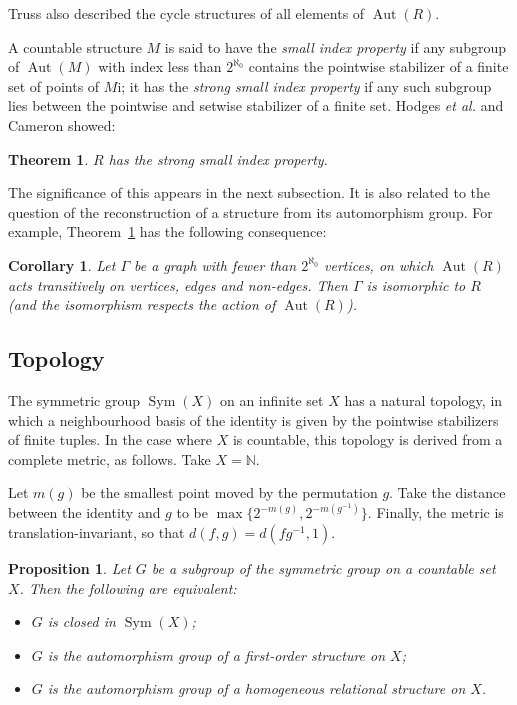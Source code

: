 \documentclass{book}
\newtheorem{theorem}{Theorem}
\newtheorem{proposition}{Proposition}
\newtheorem{corollary}{Corollary}
\DeclareMathOperator{\Sym}{Sym}
\DeclareMathOperator{\Aut}{Aut}
\begin{document}
Truss also described the cycle structures of all elements of 
$\Aut(R)$.

A countable structure $M$ is said to have the \emph{small index
property} if any subgroup of $\Aut(M)$ with index less than
$2^{\aleph_0}$ contains the pointwise stabilizer of a finite set of
points of $M$i; it has the \emph{strong small index property} if any
such subgroup lies between the pointwise and setwise stabilizer of a finite
set. Hodges {\it et al.} \cite{ch32:bib29} and Cameron \cite{ch32:new4}
showed:

\begin{theorem}\label{ch32:them8.2} 
$R$ has the strong small index property.
\end{theorem}

The significance of this appears in the next subsection.
It is also related to the question of the reconstruction of a
structure from its automorphism group. For example,
Theorem~\ref{ch32:them8.2} has the following consequence:

\begin{corollary}\label{ch32:coro8.1}
Let $\Gamma$ be a graph with fewer than $2^{\aleph_0}$
vertices, on which $\Aut(R)$ acts transitively on vertices,
edges and non-edges. Then $\Gamma$ is isomorphic to $R$ (and the
isomorphism respects the action of $\Aut(R)$).
\end{corollary}

\subsection{Topology}

The symmetric group $\Sym(X)$ on an infinite set $X$ has a natural topology,
in which a neighbourhood basis of the identity is given by the pointwise
stabilizers of finite tuples. In the case where $X$ is countable, this
topology is derived from a complete metric, as follows. Take
$X=\mathbb{N}$.

Let $m(g)$ be the smallest point moved by the permutation $g$. Take the
distance between the identity and $g$ to be $\max\{2^{-m(g)},2^{-m(g^{-1})}\}$.
Finally, the metric is translation-invariant, so that $d(f,g)=d(fg^{-1},1)$.

\begin{proposition}
Let $G$ be a subgroup of the symmetric group on a countable set $X$. Then the
following are equivalent:
\begin{itemize}
\item[(a)] $G$ is closed in $\Sym(X)$;
\item[(b)] $G$ is the automorphism group of a first-order structure on $X$;
\item[(c)] $G$ is the automorphism group of a homogeneous relational structure
on $X$.
\end{itemize}
\end{proposition}
\end{document}
